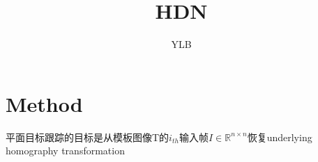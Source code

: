 \documentclass[UTF8]{ctexart}
\title{HDN}
\author{YLB}
\begin{document}
    

\section{Method}

平面目标跟踪的目标是从模板图像T的$i_{th}$输入帧$I\in \mathbb{R}^{n\times n} $恢复underlying homography transformation
\end{document}
